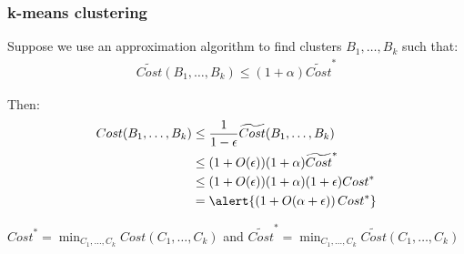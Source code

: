 \documentclass[compress]{beamer}
\begin{document}
\begin{frame}[t]
	\frametitle{k-means clustering}
	Suppose we use an approximation algorithm to find clusters $B_1, \ldots, B_k$ such that:
	\begin{align*}
		\widetilde{Cost}(B_1,\ldots, B_k) \leq (1+\alpha)\widetilde{Cost}^*
	\end{align*}
	
	Then: 
	\begin{align*}
		{Cost}(B_1,\ldots, B_k) &\leq \frac{1}{1-\epsilon}\widetilde{Cost}(B_1,\ldots, B_k) \\
		&\leq(1+O(\epsilon)) (1+\alpha)\widetilde{Cost}^*\\
		&\leq (1+O(\epsilon))(1+\alpha)(1+\epsilon){Cost}^*\\
		&= \alert{\left(1 + O(\alpha + \epsilon)\right){Cost}^*}
	\end{align*}

	\vspace{1em}
\begin{block}{\vspace*{-3ex}}
	\small ${Cost}^* = \min_{C_1, \ldots, C_k} Cost(C_1, \ldots, C_k)$ and $\widetilde{Cost}^* = \min_{C_1, \ldots, C_k} \widetilde{Cost}(C_1, \ldots, C_k) $
\end{block}
\end{frame}
\end{document}
